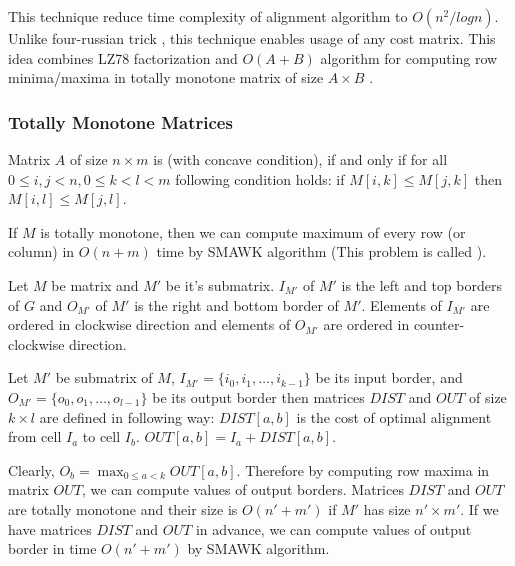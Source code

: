 This technique reduce time complexity of alignment algorithm to $O(n^2/log n)$.
Unlike four-russian trick \cite{}, this technique enables usage of any cost
matrix.  This idea combines LZ78 factorization \cite{} and $O(A+B)$ algorithm
for computing row minima/maxima in totally monotone matrix of size $A\times
B$ \cite{Aggarwal1987}.

\subsubsection{Totally Monotone Matrices}

\begin{definition}\cite{Crochemore2002}
Matrix $A$ of size $n\times m$ is  (with concave condition),
if and only if for all $0\leq i,j< n, 0\leq k<l<m$ following condition holds:
if $M[i,k]\leq M[j,k]$ then $M[i,l]\leq M[j,l]$.
\end{definition}

If $M$ is totally monotone, then we can compute maximum of every row (or column)
in $O(n+m)$ time by SMAWK algorithm \cite{Aggarwal1987} (This problem is called
).

\begin{definition}\cite{Crochemore2002}
Let $M$ be matrix and $M'$ be it's
submatrix.  $I_{M'}$ of $M'$ is the left and top
borders of $G$ and  $O_{M'}$ of $M'$ is the right and
bottom border of $M'$. Elements of $I_{M'}$ are ordered in clockwise direction
and elements of $O_{M'}$ are ordered in counter-clockwise direction.
\end{definition}

\begin{definition}\cite{Crochemore2002}
Let $M'$ be submatrix of $M$, $I_{M'}=\{i_0,i_1,\dots,i_{k-1}\}$ be its input
border, and $O_{M'}=\{o_0,o_1,\dots,o_{l-1}\}$ be its output border then
matrices
$DIST$ and $OUT$ of size $k\times l$ are defined in following way:
$DIST[a,b]$ is the cost of optimal alignment from cell $I_a$ to cell $I_b$.
$OUT[a,b]=I_a+DIST[a,b]$.
\end{definition}

Clearly, $O_b=\max_{0\leq a < k}OUT[a,b]$. Therefore by computing row maxima in
matrix $OUT$, we can compute values of output borders. Matrices $DIST$ and $OUT$
are totally monotone \cite{Crochemore2002} and their size is $O(n'+m')$ if $M'$ has size
$n'\times m'$. If we have matrices $DIST$ and $OUT$ in advance, we can compute
values of output border in time $O(n'+m')$ by SMAWK algorithm.

